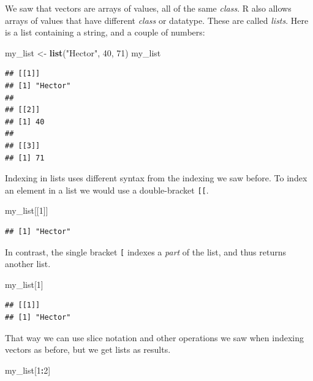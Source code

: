\documentclass[]{book}
\newenvironment{Shaded}{\begin{snugshade}}{\end{snugshade}}
\newcommand{\KeywordTok}[1]{\textcolor[rgb]{0.13,0.29,0.53}{\textbf{#1}}}
\newcommand{\DecValTok}[1]{\textcolor[rgb]{0.00,0.00,0.81}{#1}}
\newcommand{\StringTok}[1]{\textcolor[rgb]{0.31,0.60,0.02}{#1}}
\newcommand{\OperatorTok}[1]{\textcolor[rgb]{0.81,0.36,0.00}{\textbf{#1}}}
\newcommand{\NormalTok}[1]{#1}
\theoremstyle{definition}
\theoremstyle{definition}
\theoremstyle{remark}
\begin{document}
We saw that vectors are arrays of values, all of the same \emph{class}.
R also allows arrays of values that have different \emph{class} or
datatype. These are called \emph{lists}. Here is a list containing a
string, and a couple of numbers:

\begin{Shaded}
\begin{Highlighting}[]
\NormalTok{my_list <-}\StringTok{ }\KeywordTok{list}\NormalTok{(}\StringTok{"Hector"}\NormalTok{, }\DecValTok{40}\NormalTok{, }\DecValTok{71}\NormalTok{)}
\NormalTok{my_list}
\end{Highlighting}
\end{Shaded}

\begin{verbatim}
## [[1]]
## [1] "Hector"
## 
## [[2]]
## [1] 40
## 
## [[3]]
## [1] 71
\end{verbatim}

Indexing in lists uses different syntax from the indexing we saw before.
To index an element in a list we would use a double-bracket
\texttt{{[}{[}}.

\begin{Shaded}
\begin{Highlighting}[]
\NormalTok{my_list[[}\DecValTok{1}\NormalTok{]]}
\end{Highlighting}
\end{Shaded}

\begin{verbatim}
## [1] "Hector"
\end{verbatim}

In contrast, the single bracket \texttt{{[}} indexes a \emph{part} of
the list, and thus returns another list.

\begin{Shaded}
\begin{Highlighting}[]
\NormalTok{my_list[}\DecValTok{1}\NormalTok{]}
\end{Highlighting}
\end{Shaded}

\begin{verbatim}
## [[1]]
## [1] "Hector"
\end{verbatim}

That way we can use slice notation and other operations we saw when
indexing vectors as before, but we get lists as results.

\begin{Shaded}
\begin{Highlighting}[]
\NormalTok{my_list[}\DecValTok{1}\OperatorTok{:}\DecValTok{2}\NormalTok{]}
\end{Highlighting}
\end{Shaded}
\end{document}
